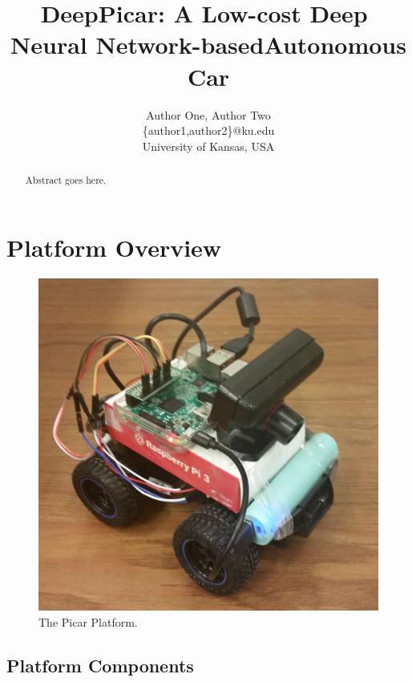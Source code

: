 \documentclass[10pt, conference]{IEEEtran}
\begin{document}
\title{DeepPicar:​ ​A​ ​Low-cost​ ​Deep​ ​Neural​ ​Network-based​ ​Autonomous​ ​Car}
\author{Author One, Author Two\\
\{author1,author2\}@ku.edu\\
University of Kansas, USA\\ 
}

\maketitle
\thispagestyle{empty}
\begin{abstract}

Abstract goes here.

\end{abstract}






\section{Platform Overview}

\begin{figure}[h]
  \centering
  \includegraphics[width=.4\textwidth]{Picar_Picture}
  \caption{ The Picar Platform. }
\end{figure}

\subsection{Platform Components}
\end{document}
